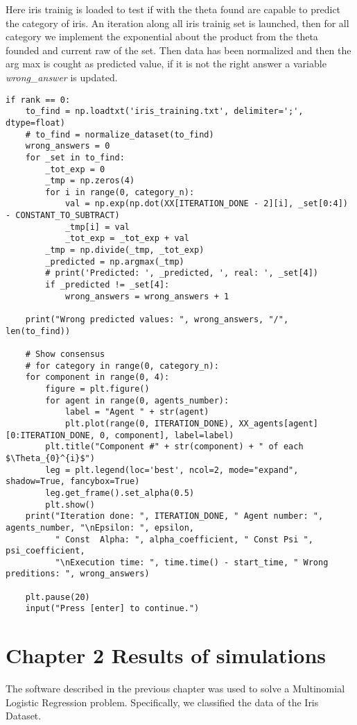 \documentclass[a4paper,11pt,oneside]{book}
\begin{document}
Here iris trainig is loaded to test if with the theta found are capable to predict the category of iris. An iteration along all iris trainig set
is launched, then for all category we implement the exponential about the product from the theta founded and current raw of the set. Then data has
been normalized and then the arg max is cought as predicted value, if it is not the right answer a variable \textit{wrong\_answer} is updated.

\begin{lstlisting}
if rank == 0:
    to_find = np.loadtxt('iris_training.txt', delimiter=';', dtype=float)
    # to_find = normalize_dataset(to_find)
    wrong_answers = 0
    for _set in to_find:
        _tot_exp = 0
        _tmp = np.zeros(4)
        for i in range(0, category_n):
            val = np.exp(np.dot(XX[ITERATION_DONE - 2][i], _set[0:4]) - CONSTANT_TO_SUBTRACT)
            _tmp[i] = val
            _tot_exp = _tot_exp + val
        _tmp = np.divide(_tmp, _tot_exp)
        _predicted = np.argmax(_tmp)
        # print('Predicted: ', _predicted, ', real: ', _set[4])
        if _predicted != _set[4]:
            wrong_answers = wrong_answers + 1

    print("Wrong predicted values: ", wrong_answers, "/", len(to_find))

    # Show consensus
    # for category in range(0, category_n):
    for component in range(0, 4):
        figure = plt.figure()
        for agent in range(0, agents_number):
            label = "Agent " + str(agent)
            plt.plot(range(0, ITERATION_DONE), XX_agents[agent][0:ITERATION_DONE, 0, component], label=label)
        plt.title("Component #" + str(component) + " of each $\Theta_{0}^{i}$")
        leg = plt.legend(loc='best', ncol=2, mode="expand", shadow=True, fancybox=True)
        leg.get_frame().set_alpha(0.5)
        plt.show()
    print("Iteration done: ", ITERATION_DONE, " Agent number: ", agents_number, "\nEpsilon: ", epsilon,
          " Const  Alpha: ", alpha_coefficient, " Const Psi ", psi_coefficient,
          "\nExecution time: ", time.time() - start_time, " Wrong preditions: ", wrong_answers)

    plt.pause(20)
    input("Press [enter] to continue.")
\end{lstlisting}




\chapter{Chapter 2 Results of simulations} \label{Cap2}
The software described in the previous chapter was used to solve a Multinomial Logistic Regression problem. Specifically, we classified the data of the Iris Dataset.
\end{document}
